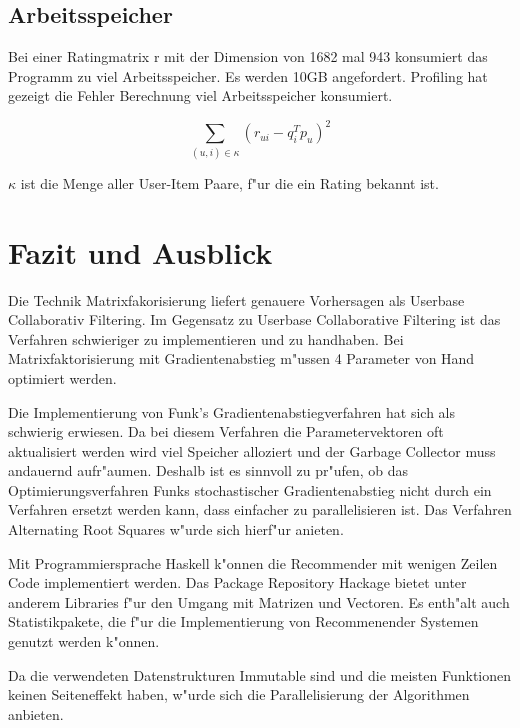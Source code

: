 \documentclass[a4paper, 12pt]{article}
\begin{document}
\subsection{Arbeitsspeicher}
\label{sec:memory}



Bei einer Ratingmatrix r mit der Dimension von 1682 mal 943 konsumiert das Programm zu viel Arbeitsspeicher. Es werden 10GB angefordert. Profiling hat gezeigt die Fehler Berechnung viel Arbeitsspeicher konsumiert.

\begin{equation}
  \label{eq:squareerror}
  \sum_{(u,i) \in \kappa} (r_{ui} - q_i^T p_u)^2
\end{equation}

$\kappa$ ist die Menge aller User-Item Paare, f"ur die ein Rating bekannt ist.

\section{Fazit und Ausblick}
\label{sec:fazit}

Die Technik Matrixfakorisierung liefert genauere Vorhersagen als Userbase Collaborativ Filtering. Im Gegensatz zu Userbase Collaborative Filtering ist das Verfahren schwieriger zu implementieren und zu handhaben. Bei Matrixfaktorisierung mit Gradientenabstieg m"ussen 4 Parameter von Hand optimiert werden.

Die Implementierung von Funk's Gradientenabstiegverfahren hat sich als schwierig erwiesen. Da bei diesem Verfahren die Parametervektoren oft aktualisiert werden wird viel Speicher alloziert und der Garbage Collector muss andauernd aufr"aumen. Deshalb ist es sinnvoll zu pr"ufen, ob das Optimierungsverfahren Funks stochastischer Gradientenabstieg nicht durch ein Verfahren ersetzt werden kann, dass einfacher zu parallelisieren ist. Das Verfahren Alternating Root Squares w"urde sich hierf"ur anieten.

Mit Programmiersprache Haskell k"onnen die Recommender mit wenigen Zeilen Code implementiert werden. Das Package Repository Hackage bietet unter anderem Libraries f"ur den Umgang mit Matrizen und Vectoren. Es enth"alt auch Statistikpakete, die f"ur die Implementierung von Recommenender Systemen genutzt werden k"onnen.

Da die verwendeten Datenstrukturen Immutable sind und die meisten Funktionen keinen Seiteneffekt haben, w"urde sich die Parallelisierung der Algorithmen anbieten.



\end{document}
